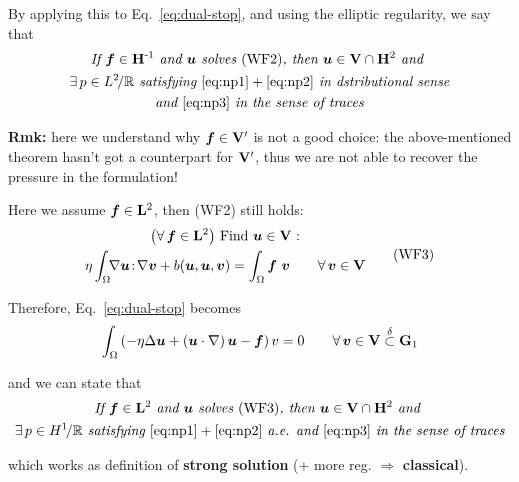 \smallskip

By applying this to Eq.~\eqref{eq:dual-stop}, and using the elliptic regularity, we say that
\begin{gather*}
\textit{If }\bm f\in\mathbf{H}^{\text{-}1} \textit{ and } \bm u \textit{ solves } \text{(WF2)} \textit{, then } \bm u\in \mathbf{V}\cap\mathbf{H}^2 \textit{ and } \\
\exists\, p\in L^2\!/\mathbb{R} \textit{ satisfying } \eqref{eq:np1}+\eqref{eq:np2}\textit{ in dstributional sense} \\
\textit{and } \eqref{eq:np3} \textit{ in the sense of traces}
\end{gather*}

{\color{blue}\textbf{Rmk:} here we understand why $\bm f\in \mathbf{V}'$ is not a good choice: the above-mentioned theorem hasn't got a counterpart for $\mathbf{V}'$, thus we are not able to recover the pressure in the formulation!}

\noindent\rlap{\rule[1.5ex]{0.495\textwidth}{.2pt}}\vspace{-0.5em}

\newcolumn

Here we assume $\bm f\in\mathbf{L}^2$, then (WF2) still holds:
\begin{equation*}
\begin{gathered}
\big(\forall\,\bm f\in\mathbf{L}^{2}\big)\text{ Find }\bm u\in \mathbf{V}\text{ :} \\ 
\eta\int_\Omega\!\! \nabla \bm u\! :\! \nabla \bm v+b(\bm u,\bm u,\bm v)=\int_\Omega\bm f\ \bm v \qquad \forall\, \bm v\in\mathbf{V}    
\end{gathered}
\tag{WF3}
\end{equation*}

Therefore, Eq.~\eqref{eq:dual-stop} becomes
\begin{equation*}
\int_\Omega \left( -\eta\Delta\bm u+ \left( \bm u\cdot\nabla \right) \bm u - \bm f \right) v =0 \qquad\forall\,\bm v\in \mathbf{V} \overset{\delta}{\subset} \mathbf{G}_1
\end{equation*}

and we can state that
\begin{gather*}
\textit{If }\bm f\in\mathbf{L}^2 \textit{ and } \bm u \textit{ solves } \text{(WF3)} \textit{, then } \bm u\in \mathbf{V}\cap\mathbf{H}^2 \textit{ and } \\
\exists\, p\in H^1\!/\mathbb{R} \textit{ satisfying } \eqref{eq:np1}+\eqref{eq:np2}\textit{ a.e. and } \eqref{eq:np3} \textit{ in the sense of traces}
\end{gather*}

which works as definition of \textbf{strong solution} (+ more reg. $\Rightarrow$ \textbf{classical}).

